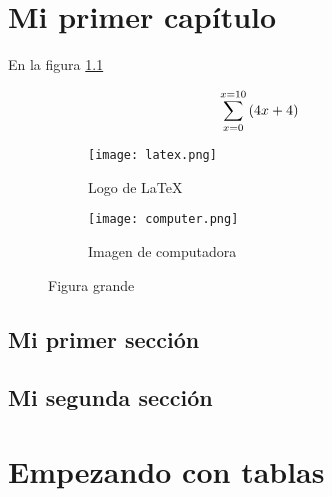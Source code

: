 \documentclass[12pt]{report}
\begin{document}
	\maketitle
	\tableofcontents
	
	\chapter{Mi primer capítulo}
		
		En la figura \ref{fig:latex-logo}
		\lipsum[1][1-11]
		
		\begin{equation}
			\tiny
            \sum_{x=0}^{x=10}{(4x+4)}
        \end{equation}
	
		\begin{figure}[h]
			\centering
			\begin{subfigure}{0.4\textwidth}
				\centering
				\texttt{[image: latex.png]}
				\caption{Logo de \LaTeX}
				\label{fig:latex-logo}
			\end{subfigure}
			\hfill
			\begin{subfigure}{0.4\textwidth}
				\centering
				\texttt{[image: computer.png]}
				\caption{Imagen de computadora}
				\label{fig:computer-image}
			\end{subfigure}
			\caption{Figura grande}
			\label{fig:grande}
		\end{figure}
		
		\section{Mi primer sección}
			\lipsum[1-2]
			\lipsum[1][1-3]
		
		\section{Mi segunda sección}
			\lipsum[3-5]
			
	\chapter{Empezando con tablas}
		
\end{document}
